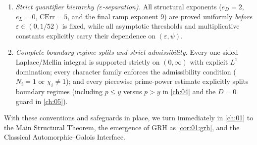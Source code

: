 \begin{enumerate}[label=\textbf{G\arabic*.}]
\item \emph{Strict quantifier hierarchy ($\varepsilon$-separation).}
All structural exponents ($e_D = 2$, $e_L = 0$, $\mathrm{CErr} = 5$, and the final ramp exponent $9$) are proved uniformly \emph{before} $\varepsilon \in (0, 1/52)$ is fixed, while all asymptotic thresholds and multiplicative constants explicitly carry their dependence on $(\varepsilon, \psi)$.

\item \emph{Complete boundary-regime splits and strict admissibility.}
Every one-sided Laplace/Mellin integral is supported strictly on $(0,\infty)$ with explicit $L^1$ domination; every character family enforces the admissibility condition ($N_i = 1$ or $\chi_i \ne 1$); and every piecewise prime-power estimate explicitly splits boundary regimes (including $p \le y$ versus $p > y$ in \cref{ch:04} and the $D = 0$ guard in \cref{ch:05}).
\end{enumerate}

With these conventions and safeguards in place, we turn immediately in \cref{ch:01} to the Main Structural Theorem, the emergence of GRH as \cref{cor:01:grh}, and the Classical Automorphic--Galois Interface.
